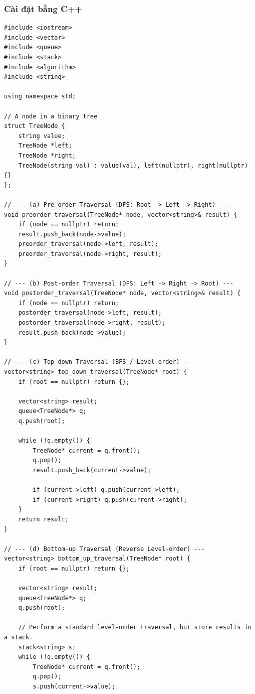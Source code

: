 \documentclass[a4paper,12pt]{article}
\begin{document}
\subsubsection{Cài đặt bằng C++}
\begin{lstlisting}[style=cppstyle, caption={Các thuật toán duyệt cây nhị phân trong C++.}, label={lst:cpp_tree_traversal}]
#include <iostream>
#include <vector>
#include <queue>
#include <stack>
#include <algorithm>
#include <string>

using namespace std;

// A node in a binary tree
struct TreeNode {
    string value;
    TreeNode *left;
    TreeNode *right;
    TreeNode(string val) : value(val), left(nullptr), right(nullptr) {}
};

// --- (a) Pre-order Traversal (DFS: Root -> Left -> Right) ---
void preorder_traversal(TreeNode* node, vector<string>& result) {
    if (node == nullptr) return;
    result.push_back(node->value);
    preorder_traversal(node->left, result);
    preorder_traversal(node->right, result);
}

// --- (b) Post-order Traversal (DFS: Left -> Right -> Root) ---
void postorder_traversal(TreeNode* node, vector<string>& result) {
    if (node == nullptr) return;
    postorder_traversal(node->left, result);
    postorder_traversal(node->right, result);
    result.push_back(node->value);
}

// --- (c) Top-down Traversal (BFS / Level-order) ---
vector<string> top_down_traversal(TreeNode* root) {
    if (root == nullptr) return {};
    
    vector<string> result;
    queue<TreeNode*> q;
    q.push(root);
    
    while (!q.empty()) {
        TreeNode* current = q.front();
        q.pop();
        result.push_back(current->value);
        
        if (current->left) q.push(current->left);
        if (current->right) q.push(current->right);
    }
    return result;
}

// --- (d) Bottom-up Traversal (Reverse Level-order) ---
vector<string> bottom_up_traversal(TreeNode* root) {
    if (root == nullptr) return {};
    
    vector<string> result;
    queue<TreeNode*> q;
    q.push(root);
    
    // Perform a standard level-order traversal, but store results in a stack.
    stack<string> s;
    while (!q.empty()) {
        TreeNode* current = q.front();
        q.pop();
        s.push(current->value);
        

\end{lstlisting}
\end{document}
